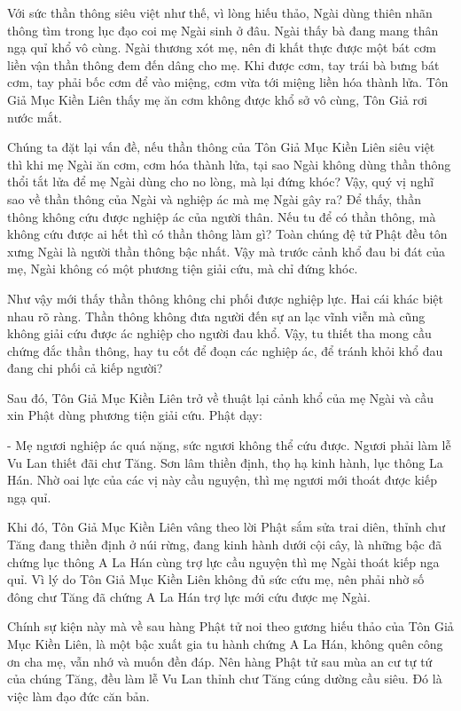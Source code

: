 \documentclass[
  12pt,
  oneside]{book}
\begin{document}
Với sức thần thông siêu việt như thế, vì lòng hiếu thảo, Ngài dùng thiên nhãn thông tìm trong lục đạo coi mẹ Ngài sinh ở đâu. Ngài thấy bà đang mang thân ngạ quỉ khổ vô cùng. Ngài thương xót mẹ, nên đi khất thực được một bát cơm liền vận thần thông đem đến dâng cho mẹ. Khi được cơm, tay trái bà bưng bát cơm, tay phải bốc cơm để vào miệng, cơm vừa tới miệng liền hóa thành lửa. Tôn Giả Mục Kiền Liên thấy mẹ ăn cơm không được khổ sở vô cùng, Tôn Giả rơi nước mắt.

Chúng ta đặt lại vấn đề, nếu thần thông của Tôn Giả Mục Kiền Liên siêu việt thì khi mẹ Ngài ăn cơm, cơm hóa thành lửa, tại sao Ngài không dùng thần thông thổi tắt lửa để mẹ Ngài dùng cho no lòng, mà lại đứng khóc? Vậy, quý vị nghĩ sao về thần thông của Ngài và nghiệp ác mà mẹ Ngài gây ra? Để thấy, thần thông không cứu được nghiệp ác của người thân. Nếu tu để có thần thông, mà không cứu được ai hết thì có thần thông làm gì? Toàn chúng đệ tử Phật đều tôn xưng Ngài là người thần thông bậc nhất. Vậy mà trước cảnh khổ đau bi đát của mẹ, Ngài không có một phương tiện giải cứu, mà chỉ đứng khóc.

Như vậy mới thấy thần thông không chi phối được nghiệp lực. Hai cái khác biệt nhau rõ ràng. Thần thông không đưa người đến sự an lạc vĩnh viễn mà cũng không giải cứu được ác nghiệp cho người đau khổ. Vậy, tu thiết tha mong cầu chứng đắc thần thông, hay tu cốt để đoạn các nghiệp ác, để tránh khỏi khổ đau đang chi phối cả kiếp người?

Sau đó, Tôn Giả Mục Kiền Liên trở về thuật lại cảnh khổ của mẹ Ngài và cầu xin Phật dùng phương tiện giải cứu. Phật dạy:

- Mẹ ngươi nghiệp ác quá nặng, sức ngươi không thể cứu được. Ngươi phải làm lễ Vu Lan thiết đãi chư Tăng. Sơn lâm thiền định, thọ hạ kinh hành, lục thông La Hán. Nhờ oai lực của các vị này cầu nguyện, thì mẹ ngươi mới thoát được kiếp ngạ quỉ.

Khi đó, Tôn Giả Mục Kiền Liên vâng theo lời Phật sắm sửa trai diên, thỉnh chư Tăng đang thiền định ở núi rừng, đang kinh hành dưới cội cây, là những bậc đã chứng lục thông A La Hán cùng trợ lực cầu nguyện thì mẹ Ngài thoát kiếp nga quỉ. Vì lý do Tôn Giả Mục Kiền Liên không đủ sức cứu mẹ, nên phải nhờ số đông chư Tăng đã chứng A La Hán trợ lực mới cứu được mẹ Ngài.

Chính sự kiện này mà về sau hàng Phật tử noi theo gương hiếu thảo của Tôn Giả Mục Kiền Liên, là một bậc xuất gia tu hành chứng A La Hán, không quên công ơn cha mẹ, vẫn nhớ và muốn đền đáp. Nên hàng Phật tử sau mùa an cư tự tứ của chúng Tăng, đều làm lễ Vu Lan thỉnh chư Tăng cúng dường cầu siêu. Đó là việc làm đạo đức căn bản.
\end{document}
